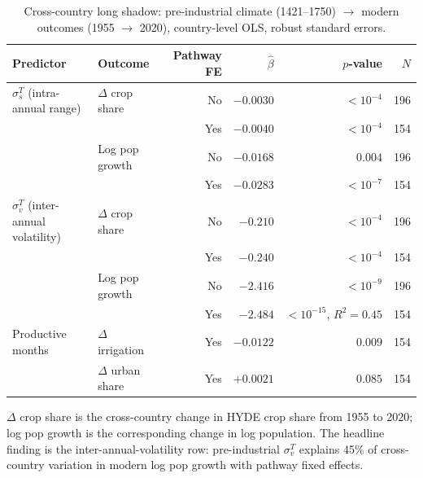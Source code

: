 \documentclass[11pt,letterpaper]{article}
\begin{document}
\begin{table}[H]
\centering
\caption{Cross-country long shadow: pre-industrial climate (1421--1750) $\to$ modern outcomes (1955 $\to$ 2020), country-level OLS, robust standard errors.}
\label{tab:shadow}
\small
\begin{tabular}{llrrrr}
\toprule
Predictor & Outcome & Pathway FE & $\hat\beta$ & $p$-value & $N$ \\
\midrule
$\sigma_s^T$ (intra-annual range)      & $\Delta$ crop share        & No  & $-0.0030$ & $<10^{-4}$ & 196 \\
                                       &                            & Yes & $-0.0040$ & $<10^{-4}$ & 154 \\
                                       & Log pop growth             & No  & $-0.0168$ & $0.004$    & 196 \\
                                       &                            & Yes & $-0.0283$ & $<10^{-7}$ & 154 \\
$\sigma_v^T$ (inter-annual volatility) & $\Delta$ crop share        & No  & $-0.210$  & $<10^{-4}$ & 196 \\
                                       &                            & Yes & $-0.240$  & $<10^{-4}$ & 154 \\
                                       & Log pop growth             & No  & $-2.416$  & $<10^{-9}$ & 196 \\
                                       &                            & Yes & $-2.484$  & $<10^{-15},\, R^2{=}0.45$ & 154 \\
Productive months                      & $\Delta$ irrigation        & Yes & $-0.0122$ & $0.009$    & 154 \\
                                       & $\Delta$ urban share       & Yes & $+0.0021$ & $0.085$    & 154 \\
\bottomrule
\end{tabular}
\par\smallskip\footnotesize{$\Delta$ crop share is the cross-country change in HYDE crop share from 1955 to 2020; log pop growth is the corresponding change in log population. The headline finding is the inter-annual-volatility row: pre-industrial $\sigma_v^T$ explains 45\% of cross-country variation in modern log pop growth with pathway fixed effects.}
\end{table}
\end{document}
